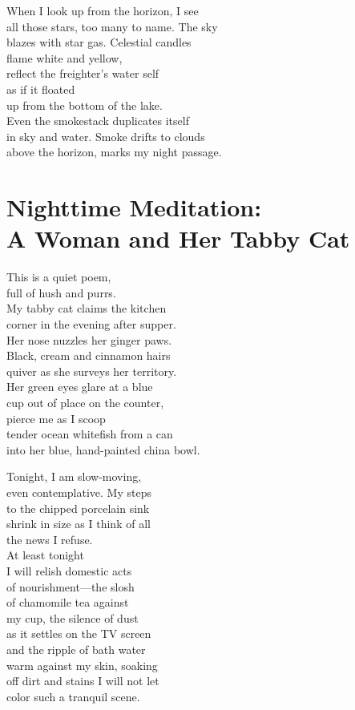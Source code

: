 \documentclass[twoside,10pt]{book}
\begin{document}
When I look up from the horizon, I see\\
all those stars, too many to name. The sky\\
blazes with star gas. Celestial candles\\
flame white and yellow,\\
reflect the freighter's water self\\
as if it floated\\
up from the bottom of the lake.\\
Even the smokestack duplicates itself\\
in sky and water. Smoke drifts to clouds\\
above the horizon, marks my night passage.


\clearpage
\section{Nighttime Meditation:\\ A Woman and Her Tabby Cat}

This is a quiet poem,\\
full of hush and purrs.\\
My tabby cat claims the kitchen\\
corner in the evening after supper.\\
Her nose nuzzles her ginger paws.\\
Black, cream and cinnamon hairs\\
quiver as she surveys her territory.\\
Her green eyes glare at a blue\\
cup out of place on the counter,\\
pierce me as I scoop\\
tender ocean whitefish from a can\\
into her blue, hand-painted china bowl.

Tonight, I am slow-moving,\\
even contemplative. My steps\\
to the chipped porcelain sink\\
shrink in size as I think of all\\
the news I refuse.\\
At least tonight\\
I will relish domestic acts\\
of nourishment---the slosh\\
of chamomile tea against\\
my cup, the silence of dust\\
as it settles on the TV screen\\
and the ripple of bath water\\
warm against my skin, soaking\\
off dirt and stains I will not let\\
color such a tranquil scene.
\end{document}
